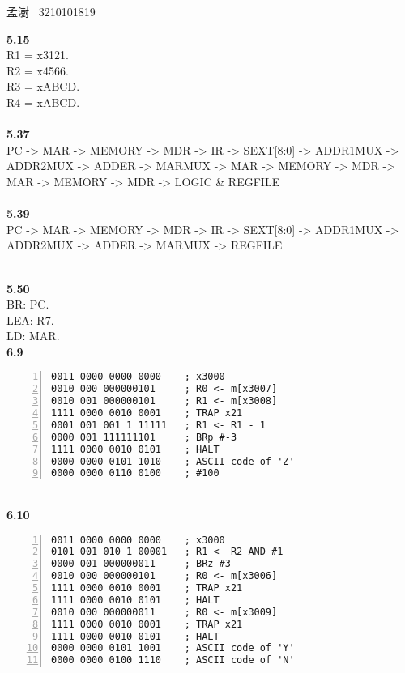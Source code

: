 \documentclass[a4paper,12pt]{article}     %
\begin{document}
\begin{center}   %
孟澍 \ 3210101819
\end{center}


\noindent %
\textbf{5.15}\\
R1 = x3121.\\
R2 = x4566.\\
R3 = xABCD.\\
R4 = xABCD.\\


~\\
\textbf{5.37}\\
PC -> MAR -> MEMORY -> MDR -> IR -> SEXT[8:0] -> ADDR1MUX -> ADDR2MUX -> ADDER -> MARMUX -> MAR -> MEMORY -> MDR -> MAR -> MEMORY -> MDR -> LOGIC \& REGFILE\\

~\\
\textbf{5.39}\\
PC -> MAR -> MEMORY -> MDR -> IR -> SEXT[8:0] -> ADDR1MUX -> ADDR2MUX -> ADDER -> MARMUX -> REGFILE

~\\
\textbf{5.50}\\
BR: PC.\\
LEA: R7.\\
LD: MAR.\\

\newpage
\textbf{6.9}\\
\begin{Verbatim}[frame = single, numbers = left]
0011 0000 0000 0000    ; x3000
0010 000 000000101     ; R0 <- m[x3007]
0010 001 000000101     ; R1 <- m[x3008]
1111 0000 0010 0001    ; TRAP x21
0001 001 001 1 11111   ; R1 <- R1 - 1
0000 001 111111101     ; BRp #-3
1111 0000 0010 0101    ; HALT
0000 0000 0101 1010    ; ASCII code of 'Z'
0000 0000 0110 0100    ; #100
\end{Verbatim}

~\\
\textbf{6.10}\\
\begin{Verbatim}[frame = single, numbers = left]
0011 0000 0000 0000    ; x3000
0101 001 010 1 00001   ; R1 <- R2 AND #1
0000 001 000000011     ; BRz #3
0010 000 000000101     ; R0 <- m[x3006]
1111 0000 0010 0001    ; TRAP x21
1111 0000 0010 0101    ; HALT
0010 000 000000011     ; R0 <- m[x3009]
1111 0000 0010 0001    ; TRAP x21
1111 0000 0010 0101    ; HALT
0000 0000 0101 1001    ; ASCII code of 'Y'
0000 0000 0100 1110    ; ASCII code of 'N'
\end{Verbatim}
\end{document}

